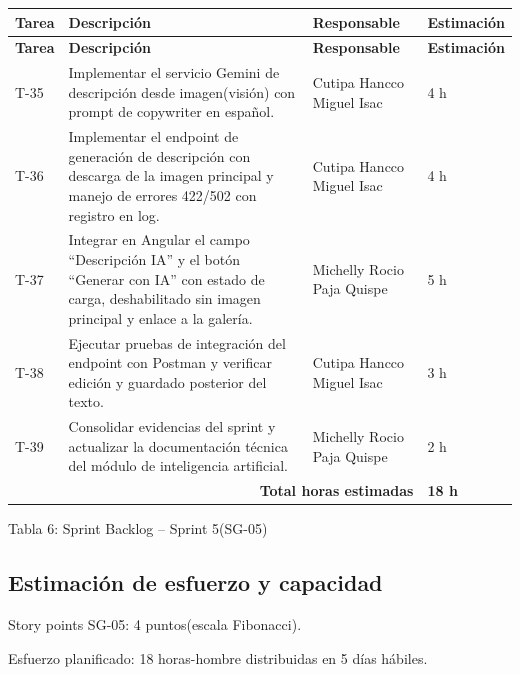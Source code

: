 \documentclass[12pt,a4paper]{article}
\begin{document}
{\small
\begin{longtable}{p{1.2cm} p{7.9cm} p{4.2cm} p{1.7cm}}
\toprule
\textbf{Tarea} & \textbf{Descripción} & \textbf{Responsable} & \textbf{Estimación} \\
\midrule
\endfirsthead

\toprule
\textbf{Tarea} & \textbf{Descripción} & \textbf{Responsable} & \textbf{Estimación} \\
\midrule
\endhead

\bottomrule
\endlastfoot

T-35 & Implementar el servicio Gemini de descripción desde imagen(visión) con prompt de copywriter en español. & Cutipa Hancco Miguel Isac & 4 h \\
T-36 & Implementar el endpoint de generación de descripción con descarga de la imagen principal y manejo de errores 422/502 con registro en log. & Cutipa Hancco Miguel Isac & 4 h \\
T-37 & Integrar en Angular el campo ``Descripción IA'' y el botón ``Generar con IA'' con estado de carga, deshabilitado sin imagen principal y enlace a la galería. & Michelly Rocio Paja Quispe & 5 h \\
T-38 & Ejecutar pruebas de integración del endpoint con Postman y verificar edición y guardado posterior del texto. & Cutipa Hancco Miguel Isac & 3 h \\
T-39 & Consolidar evidencias del sprint y actualizar la documentación técnica del módulo de inteligencia artificial. & Michelly Rocio Paja Quispe & 2 h \\

\midrule
\multicolumn{3}{r}{\textbf{Total horas estimadas}} & \textbf{18 h} \\

\end{longtable}
}

\begin{center}
\small Tabla 6: Sprint Backlog -- Sprint 5(SG-05)
\end{center}

\subsection*{Estimación de esfuerzo y capacidad}

Story points SG-05: 4 puntos(escala Fibonacci).

Esfuerzo planificado: 18 horas-hombre distribuidas en 5 días hábiles.
\end{document}
